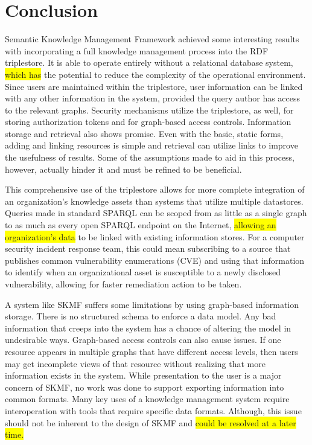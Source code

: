 \chapter{Conclusion}
\label{concl}

Semantic Knowledge Management Framework achieved some interesting results with incorporating a full knowledge management process into the RDF triplestore. It is able to operate entirely without a relational database system,
\colorbox{yellow}{which has}
the potential to reduce the complexity of the operational environment. Since users are maintained within the triplestore, user information can be linked with any other information in the system, provided the query author has access to the relevant graphs. Security mechanisms utilize the triplestore, as well, for storing authorization tokens and for graph-based access controls. Information storage and retrieval also shows promise. Even with the basic, static forms, adding and linking resources is simple and retrieval can utilize links to improve the usefulness of results. Some of the assumptions made to aid in this process, however, actually hinder it and must be refined to be beneficial.

This comprehensive use of the triplestore allows for more complete integration of an organization's knowledge assets than systems that utilize multiple datastores. Queries made in standard SPARQL can be scoped from as little as a single graph to as much as every open SPARQL endpoint on the Internet,
\colorbox{yellow}{allowing an organization's data}
to be linked with existing information stores. For a computer security incident response team, this could mean subscribing to a source that publishes common vulnerability enumerations (CVE) and using that information to identify when an organizational asset is susceptible to a newly disclosed vulnerability, allowing for faster remediation action to be taken.

A system like SKMF suffers some limitations by using graph-based information storage. There is no structured schema to enforce a data model. Any bad information that creeps into the system has a chance of altering the model in undesirable ways. Graph-based access controls can also cause issues. If one resource appears in multiple graphs that have different access levels, then users may get incomplete views of that resource without realizing that more information exists in the system. While presentation to the user is a major concern of SKMF, no work was done to support exporting information into common formats. Many key uses of a knowledge management system require interoperation with tools that require specific data formats. Although, this issue should not be inherent to the design of SKMF and
\colorbox{yellow}{could be resolved at a later time.}

